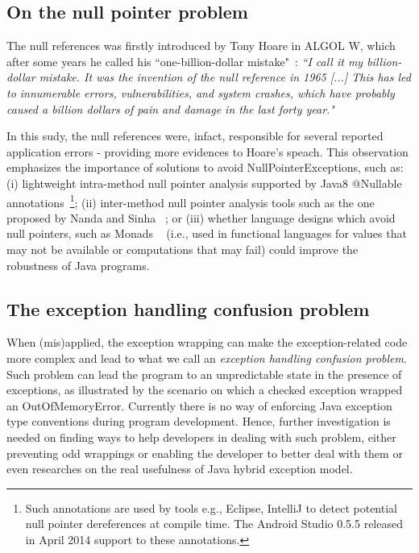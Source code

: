 \documentclass[conference]{IEEEtran}
\begin{document}
\subsection{On the null pointer problem}
The null references was firstly introduced by Tony Hoare in ALGOL W, which after some years he called his ``one-billion-dollar mistake"~\cite{hoare2}:
\emph{``I call it my billion-dollar mistake. It was the invention of the null reference in 1965 [...] This has led to innumerable errors, vulnerabilities, and system 
crashes, which have probably caused a billion dollars of pain and damage in the last forty year."}

In this sudy, the null references were, infact, responsible for several reported application errors - providing more evidences to Hoare's speach.
This observation emphasizes the importance of solutions to avoid NullPointerExceptions, such as:
(i) lightweight intra-method null pointer analysis supported by Java8 @Nullable annotations~\footnote{Such annotations are used by tools e.g., Eclipse, IntelliJ to detect potential 
null pointer dereferences at compile time. The Android Studio 0.5.5 released in April 2014 support to these annotations.};
(ii) inter-method null pointer analysis tools such as the one proposed by Nanda and Sinha ~\cite{nanda2009accurate};
or (iii) whether language designs which avoid null pointers, such 
as Monads ~\cite{Walde95} (i.e., used in functional languages for values that may not be available 
or computations that may fail) could improve the robustness of Java programs. 


\subsection{The exception handling confusion problem}
When (mis)applied, the exception wrapping can make the exception-related code
 more complex and lead to what we call an \emph{exception handling confusion problem}.
Such problem can lead the program to an unpredictable state in the presence of exceptions,
as illustrated by the scenario on which a checked exception wrapped an OutOfMemoryError. 
Currently there is no way of enforcing Java exception type conventions during program development.
Hence, further investigation is needed on finding ways to help developers in dealing with such
 problem, either preventing odd wrappings or enabling the developer to better deal with them or even
researches on the real usefulness of Java hybrid exception model. 

\end{document}
